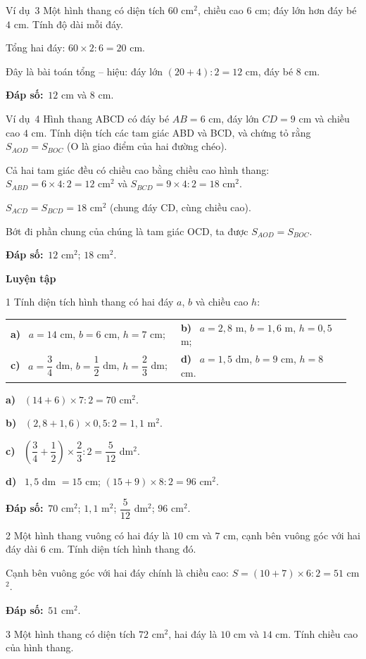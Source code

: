 \documentclass[11pt]{article}
\makeatletter
\newif\ifsol \solfalse
\renewcommand{\arraystretch}{1.35}
\providecommand{\AnsWord}{Đáp số}
\newcommand{\dapso}[1]{\par\textbf{\AnsWord:}\ #1}
\newcommand{\guide}{\par\vspace{4pt}{\bfseries\color{tmBlue}\GuideWord}\par\vspace{3pt}\nopagebreak}
\newcommand{\probsol}[1]{%
  \begin{lrbox}{\solmeasure}\begin{minipage}{\dimexpr\linewidth-24pt\relax}#1\end{minipage}\end{lrbox}%
  \ifsol
    \begin{solbox}#1\end{solbox}%
  \else
    \setlength{\solht}{\dimexpr\ht\solmeasure+\dp\solmeasure+0.85cm\relax}%
    \ifdim\solht<1.35cm\setlength{\solht}{1.35cm}\fi
    \begin{tcolorbox}[colback=white,colframe=Line,boxrule=0.8pt,arc=5pt,
      left=8pt,right=8pt,top=4pt,bottom=4pt,height=\solht]{\footnotesize\color{Slate}\itshape\WorkWord}\end{tcolorbox}%
  \fi}
\newcommand{\dividerbar}[1]{\par\vspace{0.6em}\noindent
  \begin{tcolorbox}[enhanced,frame hidden,interior hidden,borderline west={5pt}{0pt}{ProbBlue},
    colback=white,left=12pt,right=12pt,top=5pt,bottom=5pt,arc=4pt]
  {\large\bfseries\color{ProbBlue} #1}\end{tcolorbox}\vspace{0.4em}}
\newcommand{\pa}[1]{\textbf{#1)}\ }
\newenvironment{cols2}{\par\vspace{3pt}\noindent\setlength{\tabcolsep}{0pt}\renewcommand{\arraystretch}{1.3}%
  \begin{tabular}{@{}>{\raggedright\arraybackslash\rule{0pt}{4.4ex}}p{0.48\linewidth}<{\rule[-2.3ex]{0pt}{0pt}}@{\hspace{0.03\linewidth}}>{\raggedright\arraybackslash\rule{0pt}{4.4ex}}p{0.48\linewidth}<{\rule[-2.3ex]{0pt}{0pt}}@{}}}%
  {\end{tabular}\par}
\newcommand{\gap}{\vspace{0.3cm}}
\def\GuideWord{Hướng dẫn giải.}
\def\WorkWord{Bài làm:}
\def\AnsWord{Đáp số}
\def\ExWord{Ví dụ}
\makeatother
\begin{document}
\gap
\begin{exbox}{\ExWord\ 3}
Một hình thang có diện tích $60$ cm$^2$, chiều cao $6$ cm; đáy lớn hơn đáy bé $4$ cm. Tính độ dài mỗi đáy.
\guide
Tổng hai đáy: $60\times2:6=20$ cm.\par Đây là bài toán tổng -- hiệu: đáy lớn $(20+4):2=12$ cm, đáy bé $8$ cm.
\dapso{$12$ cm và $8$ cm.}
\end{exbox}
\gap
\begin{exbox}{\ExWord\ 4}
Hình thang ABCD có đáy bé $AB=6$ cm, đáy lớn $CD=9$ cm và chiều cao $4$ cm. Tính diện tích các tam giác ABD và BCD, và chứng tỏ rằng $S_{AOD}=S_{BOC}$ (O là giao điểm của hai đường chéo).
\guide
Cả hai tam giác đều có chiều cao bằng chiều cao hình thang: $S_{ABD}=6\times4:2=12$ cm$^2$ và $S_{BCD}=9\times4:2=18$ cm$^2$.\par
$S_{ACD}=S_{BCD}=18$ cm$^2$ (chung đáy CD, cùng chiều cao).\par Bớt đi phần chung của chúng là tam giác OCD, ta được $S_{AOD}=S_{BOC}$.
\dapso{$12$ cm$^2$; $18$ cm$^2$.}
\end{exbox}
\dividerbar{Luyện tập}
\begin{probbox}{1}{\relax}
Tính diện tích hình thang có hai đáy $a$, $b$ và chiều cao $h$:
\begin{cols2}
\pa{a} $a=14$ cm, $b=6$ cm, $h=7$ cm; & \pa{b} $a=2{,}8$ m, $b=1{,}6$ m, $h=0{,}5$ m;\\
\pa{c} $a=\dfrac34$ dm, $b=\dfrac12$ dm, $h=\dfrac23$ dm; & \pa{d} $a=1{,}5$ dm, $b=9$ cm, $h=8$ cm.
\end{cols2}
\end{probbox}
\probsol{
\pa{a} $(14+6)\times7:2=70$ cm$^2$.\par \pa{b} $(2{,}8+1{,}6)\times0{,}5:2=1{,}1$ m$^2$.\par \pa{c} $\left(\dfrac34+\dfrac12\right)\times\dfrac23:2=\dfrac5{12}$ dm$^2$.\par \pa{d} $1{,}5$ dm $=15$ cm; $(15+9)\times8:2=96$ cm$^2$.
\dapso{$70$ cm$^2$; $1{,}1$ m$^2$; $\dfrac5{12}$ dm$^2$; $96$ cm$^2$.}}
\gap
\begin{probbox}{2}{\relax}
Một hình thang vuông có hai đáy là $10$ cm và $7$ cm, cạnh bên vuông góc với hai đáy dài $6$ cm. Tính diện tích hình thang đó.
\end{probbox}
\probsol{
Cạnh bên vuông góc với hai đáy chính là chiều cao: $S=(10+7)\times6:2=51$ cm$^2$.
\dapso{$51$ cm$^2$.}}
\gap
\begin{probbox}{3}{\relax}
Một hình thang có diện tích $72$ cm$^2$, hai đáy là $10$ cm và $14$ cm. Tính chiều cao của hình thang.
\end{probbox}
\end{document}
